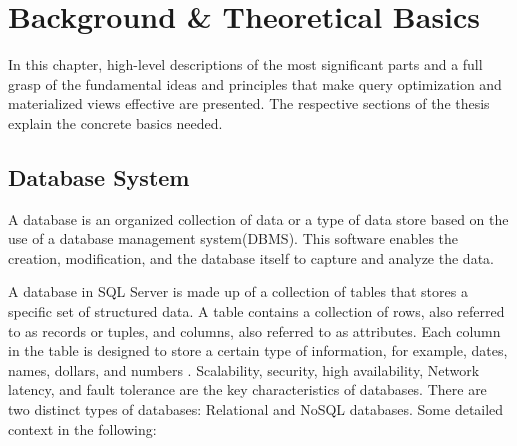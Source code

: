 \section{Background \& Theoretical Basics }

In this chapter, high-level descriptions of the most significant parts and a full grasp of the fundamental ideas and principles that make query optimization and materialized views effective are presented. The respective sections of the thesis explain the concrete basics needed.

\subsection{ Database System}

\begin{definition}
A database is an organized collection of data or a type of data store based on the use of a database management system(DBMS). This software enables the creation, modification, and the database itself to capture and analyze the data. \end{definition}
A database in SQL Server is made up of a collection of tables that stores a specific set of structured data. A table contains a collection of rows, also referred to as records or tuples, and columns, also referred to as attributes. Each column in the table is designed to store a certain type of information, for example, dates, names, dollars, and numbers \cite{williamdassafmsft-2024}. Scalability, security, high availability, Network latency, and fault tolerance are the key characteristics of databases. There are two distinct types of databases: Relational and NoSQL databases. Some detailed context in the following: 

